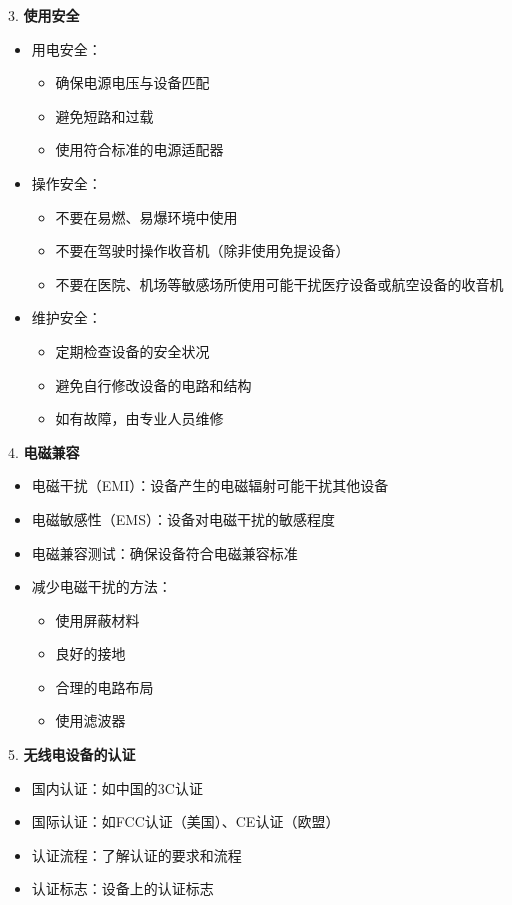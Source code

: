\documentclass[12pt,UTF8]{ctexbook}
\begin{document}
3. \textbf{使用安全}
   \begin{itemize}[leftmargin=3.5em]
   \item 用电安全：
     \begin{itemize}
       \item 确保电源电压与设备匹配
       \item 避免短路和过载
       \item 使用符合标准的电源适配器
     \end{itemize}
   \item 操作安全：
     \begin{itemize}
       \item 不要在易燃、易爆环境中使用
       \item 不要在驾驶时操作收音机（除非使用免提设备）
       \item 不要在医院、机场等敏感场所使用可能干扰医疗设备或航空设备的收音机
     \end{itemize}
   \item 维护安全：
     \begin{itemize}
       \item 定期检查设备的安全状况
       \item 避免自行修改设备的电路和结构
       \item 如有故障，由专业人员维修
     \end{itemize}
   \end{itemize}

4. \textbf{电磁兼容}
   \begin{itemize}[leftmargin=3.5em]
   \item 电磁干扰（EMI）：设备产生的电磁辐射可能干扰其他设备
   \item 电磁敏感性（EMS）：设备对电磁干扰的敏感程度
   \item 电磁兼容测试：确保设备符合电磁兼容标准
   \item 减少电磁干扰的方法：
     \begin{itemize}
       \item 使用屏蔽材料
       \item 良好的接地
       \item 合理的电路布局
       \item 使用滤波器
     \end{itemize}
   \end{itemize}

5. \textbf{无线电设备的认证}
   \begin{itemize}[leftmargin=3.5em]
   \item 国内认证：如中国的3C认证
   \item 国际认证：如FCC认证（美国）、CE认证（欧盟）
   \item 认证流程：了解认证的要求和流程
   \item 认证标志：设备上的认证标志
   \end{itemize}
\end{document}
